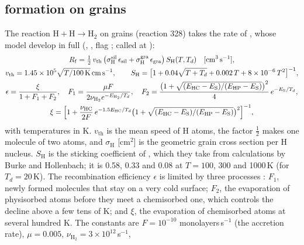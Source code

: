 \subsection{\texorpdfstring{\Htwo}{H2} formation on grains}
\label{sec:formation}

The reaction $\mathrm H+\mathrm H\to\mathrm{H_2}$ on grains (reaction 328) takes the
rate of \citet[their eqs.~15--18]{CazauxTielens2002}, whose model
\citet{CazauxTielens2004} develop in full (,
, flag ; called at
):
\begin{gather}
  R_{\mathrm f} = \tfrac12\,v_{\mathrm{th}}\,
     \bigl(\sigma^{\mathrm{sil}}_{\mathrm H}\,\epsilon_{\mathrm{sil}}+\sigma^{\mathrm{gra}}_{\mathrm H}\,\epsilon_{\mathrm{gra}}\bigr)\,
     S_{\mathrm H}(T,T_d)\quad[\mathrm{cm^3\,s^{-1}}],
  \label{eq:rform}\\
  v_{\mathrm{th}} = 1.45\times10^{5}\sqrt{T/100\,\mathrm K}\,\mathrm{cm\,s^{-1}},\qquad
  S_{\mathrm H} = \bigl[1+0.04\sqrt{T+T_d}+0.002\,T+8\times10^{-6}\,T^2\bigr]^{-1},\\
  \epsilon = \frac{\xi}{1+F_1+F_2},\quad
  F_1 = \frac{\mu F}{2\nu_{\mathrm{H_2}}e^{-E_{\mathrm{H_2}}/T_d}},\quad
  F_2 = \frac{\bigl(1+\sqrt{(E_{\mathrm{HC}}-E_{\mathrm S})/(E_{\mathrm{HP}}-E_{\mathrm S})}\bigr)^2}{4}\,e^{-E_{\mathrm S}/T_d},\\
  \xi = \Bigl[1+\frac{\nu_{\mathrm{HC}}}{2F}\,e^{-1.5E_{\mathrm{HC}}/T_d}
        \bigl(1+\sqrt{(E_{\mathrm{HC}}-E_{\mathrm S})/(E_{\mathrm{HP}}-E_{\mathrm S})}\bigr)^2\Bigr]^{-1},
\end{gather}
with temperatures in K. $v_{\mathrm{th}}$ is the mean speed of H atoms, the factor
$\frac12$ makes one molecule of two atoms, and $\sigma_{\mathrm H}$ [cm$^2$] is the
geometric grain cross section per H nucleus. $S_{\mathrm H}$ is the sticking
coefficient of \citet[eq.~3.7]{HollenbachMcKee1979}, which they take from
calculations by Burke and Hollenbach; it is 0.58, 0.33 and 0.08 at $T=100$,
300 and 1000\,K (for $T_d=20$\,K). The recombination efficiency $\epsilon$ is
limited by three processes \citep{CazauxTielens2002}: $F_1$, newly formed
molecules that stay on a very cold surface; $F_2$, the evaporation of
physisorbed atoms before they meet a chemisorbed one, which controls the
decline above a few tens of K; and $\xi$, the evaporation of chemisorbed atoms at
several hundred K. The constants are $F=10^{-10}$ monolayers\,s$^{-1}$ (the
accretion rate), $\mu=0.005$, $\nu_{\mathrm{H_2}}=3\times10^{12}$\,s$^{-1}$,
